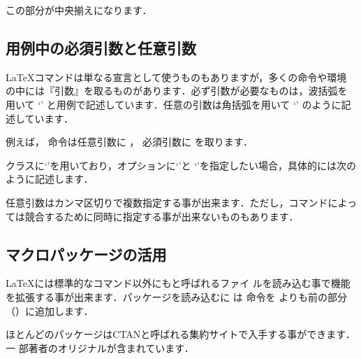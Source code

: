 \begin{intext}
\begin{center}
 この部分が中央揃えになります．
\end{center}
\end{intext}

\subsection{用例中の必須引数と任意引数}
%
%
%
\LaTeX コマンドは単なる宣言として使うものもありますが，多くの命令や環境
の中には『引数』を取るものがあります．必ず引数が必要なものは，波括弧を
用いて `' と用例で記述しています．任意の引数は角括弧を用いて
`' のように記述しています．

例えば，  命令は任意引数に ，
必須引数に  を取ります．


クラスに`'を用いており，オプションに`'と
`'を指定したい場合，具体的には次のように記述します．
任意引数はカンマ区切りで複数指定する事が出来ます．ただし，コマンドによっ
ては競合するために同時に指定する事が出来ないものもあります．


\subsection{マクロパッケージの活用}
%
%
%
%
%
\LaTeX には標準的なコマンド以外にもと呼ばれるファイ
ルを読み込む事で機能を拡張する事が出来ます．パッケージを読み込むに
は  命令を \verb|| よりも前の部分（）に追加します．


ほとんどのパッケージはCTANと呼ばれる集約サイトで入手する事ができます．一
部著者のオリジナルが含まれています．

